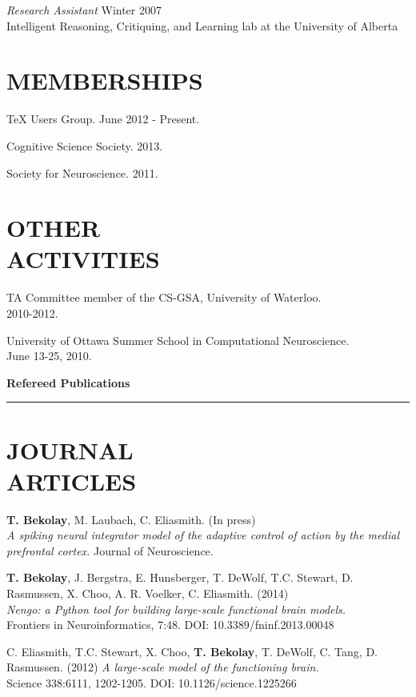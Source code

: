 \documentclass[line,margin]{res}
\begin{document}
\begin{resume}
{\sl Research Assistant} \hfill Winter 2007 \\
Intelligent Reasoning, Critiquing, and Learning lab at the University of Alberta

\section{MEMBERSHIPS}

TeX Users Group. June 2012 - Present.

Cognitive Science Society. 2013.

Society for Neuroscience. 2011.

\section{OTHER \\ ACTIVITIES}

TA Committee member of the CS-GSA, University of Waterloo. \\
2010-2012.

University of Ottawa Summer School in Computational Neuroscience. \\
June 13-25, 2010.

\clearpage

{\Large \bf Refereed Publications} \\ \vspace{-8pt} \hrule

\section{JOURNAL \\ARTICLES}

\textbf{T. Bekolay}, M. Laubach, C. Eliasmith. (In press) \\
  {\sl A spiking neural integrator model of the adaptive control of action
  by the medial prefrontal cortex.} Journal of Neuroscience.

\textbf{T. Bekolay}, J. Bergstra, E. Hunsberger, T. DeWolf, T.C. Stewart,
  D. Rasmussen, X. Choo, A. R. Voelker, C. Eliasmith. (2014) \\
  {\sl Nengo: a Python tool for building large-scale functional
  brain models.} \\ Frontiers in Neuroinformatics, 7:48.
  DOI: 10.3389/fninf.2013.00048

C. Eliasmith, T.C. Stewart, X. Choo, \textbf{T. Bekolay},
  T. DeWolf, C. Tang, D. Rasmussen. (2012)
  {\sl A large-scale model of the functioning brain.} \\
  Science 338:6111, 1202-1205. DOI: 10.1126/science.1225266


\end{resume}
\end{document}
